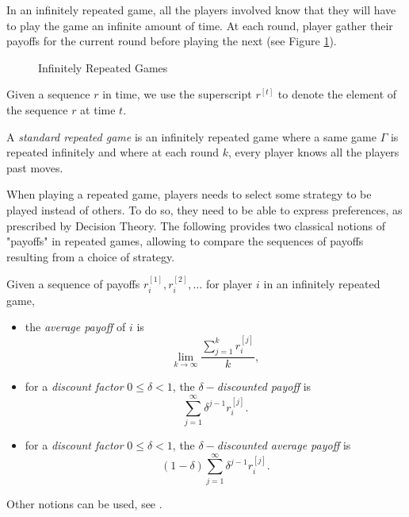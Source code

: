 In an infinitely repeated game, all the players involved know that they will have to play the game an infinite amount of time.
At each round, player gather their payoffs for the current round before playing the next (see Figure \ref{fig:infiRepeated}).
\begin{figure}[]
\centering
{}
\caption{Infinitely Repeated Games}
\label{fig:infiRepeated}
\end{figure}
\begin{notation}
Given a sequence $r$ in time, we use the superscript $r^{[t]}$ to denote the element of the sequence $r$ at time $t$.
\end{notation}
\begin{definition}
A \emph{standard repeated game} is an infinitely repeated game where a same game $\Gamma$ is repeated infinitely and where at each round $k$, every player knows all the players past moves.
\end{definition}
When playing a repeated game, players needs to select some strategy to be played instead of others. To do so, they need to be able to express preferences, as prescribed by Decision Theory.
The following provides two classical notions of "payoffs" in repeated games, allowing to compare the sequences of payoffs resulting from a choice of strategy.
\begin{definition}
Given a sequence of payoffs $r_i^{[1]}, r_i^{[2]}, \ldots$ for player $i$ in an infinitely repeated game,
\begin{itemize}
\item the \emph{average payoff} of $i$ is
\begin{equation}
 \lim_{k \rightarrow \infty} \frac{\sum_{j = 1}^k r_i^{[j]}}{k},
 \label{eq:averagePayoffRep}
 \end{equation}
\item for a \emph{discount factor} $ 0 \leq \delta < 1$, the \emph{$\delta-$discounted payoff} is
\begin{equation}
\sum_{j = 1}^{\infty} \delta^{j-1} r_i^{[j]}.
\label{eq:discountedPayoffRep}
 \end{equation}
 \item for a \emph{discount factor} $ 0 \leq \delta < 1$, the \emph{$\delta-$discounted average payoff} is
\begin{equation}
(1-\delta) \sum_{j = 1}^{\infty} \delta^{j-1} r_i^{[j]}.
\label{eq:discountedAvgPayoffRep}
 \end{equation}
\end{itemize}
\end{definition}
Other notions can be used, see \cite[page 315]{MyGTAO}.

